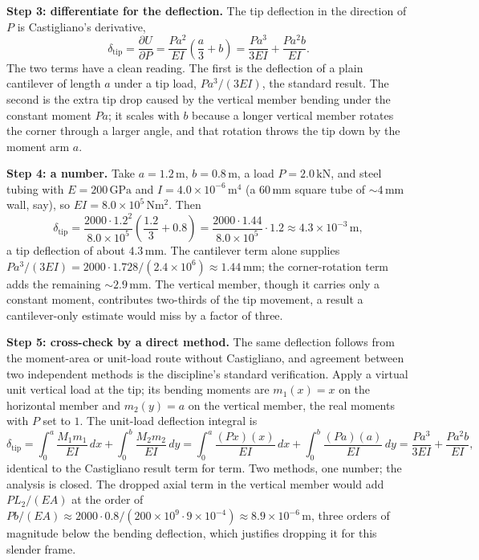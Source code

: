 \textbf{Step 3: differentiate for the deflection.} The tip deflection in
the direction of $P$ is Castigliano's derivative,
\[
\delta_\text{tip} = \frac{\partial U}{\partial P}
  = \frac{P a^2}{EI}\left(\frac{a}{3} + b\right)
  = \frac{P a^3}{3EI} + \frac{P a^2 b}{EI}.
\]
The two terms have a clean reading. The first is the deflection of a
plain cantilever of length $a$ under a tip load, $Pa^3/(3EI)$, the
standard result. The second is the extra tip drop caused by the vertical
member bending under the constant moment $Pa$; it scales with $b$ because
a longer vertical member rotates the corner through a larger angle, and
that rotation throws the tip down by the moment arm $a$.

\textbf{Step 4: a number.} Take $a = 1.2\,\si{\meter}$,
$b = 0.8\,\si{\meter}$, a load $P = 2.0\,\si{\kilo\newton}$, and steel
tubing with $E = 200\,\si{\giga\pascal}$ and
$I = 4.0\times 10^{-6}\,\si{\meter\tothe{4}}$ (a $60\,\si{\milli\meter}$
square tube of $\sim 4\,\si{\milli\meter}$ wall, say), so
$EI = 8.0\times 10^{5}\,\si{\newton\meter\squared}$. Then
\[
\delta_\text{tip}
= \frac{2000 \cdot 1.2^2}{8.0\times 10^{5}}
  \left(\frac{1.2}{3} + 0.8\right)
= \frac{2000 \cdot 1.44}{8.0\times 10^{5}} \cdot 1.2
\approx 4.3\times 10^{-3}\,\si{\meter},
\]
a tip deflection of about $4.3\,\si{\milli\meter}$. The cantilever term
alone supplies $Pa^3/(3EI) = 2000\cdot 1.728/(2.4\times 10^{6}) \approx
1.44\,\si{\milli\meter}$; the corner-rotation term adds the remaining
$\sim 2.9\,\si{\milli\meter}$. The vertical member, though it carries
only a constant moment, contributes two-thirds of the tip movement, a
result a cantilever-only estimate would miss by a factor of three.

\textbf{Step 5: cross-check by a direct method.} The same deflection
follows from the moment-area or unit-load route without Castigliano, and
agreement between two independent methods is the discipline's standard
verification. Apply a virtual unit vertical load at the tip; its bending
moments are $m_1(x) = x$ on the horizontal member and $m_2(y) = a$ on the
vertical member, the real moments with $P$ set to $1$. The unit-load
deflection integral is
\[
\delta_\text{tip}
= \int_0^a \frac{M_1 m_1}{EI}\,dx + \int_0^b \frac{M_2 m_2}{EI}\,dy
= \int_0^a \frac{(Px)(x)}{EI}\,dx + \int_0^b \frac{(Pa)(a)}{EI}\,dy
= \frac{P a^3}{3EI} + \frac{P a^2 b}{EI},
\]
identical to the Castigliano result term for term. Two methods, one
number; the analysis is closed. The dropped axial term in the vertical
member would add $PL_2/(EA)$ at the order of $P b/(EA) \approx 2000 \cdot
0.8/(200\times 10^9 \cdot 9\times 10^{-4}) \approx 8.9\times 10^{-6}\,
\si{\meter}$, three orders of magnitude below the bending deflection, which
justifies dropping it for this slender frame.

